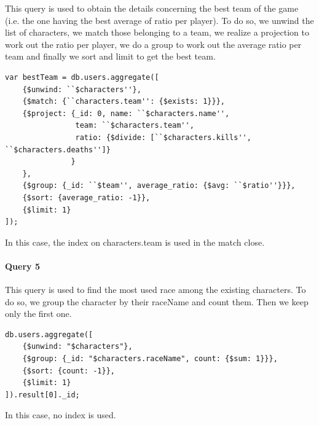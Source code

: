\documentclass[a4paper, 11pt]{article}
\begin{document}
This query is used to obtain the details concerning the best team of the game (i.e. the one having the best average of ratio per player).
To do so, we unwind the list of characters, we match those belonging to a team, we realize a projection to work out the ratio per player, we do a group to work out the average ratio per team and finally we sort and limit to get the best team.

\begin{lstlisting}
var bestTeam = db.users.aggregate([
    {$unwind: ``$characters''}, 
    {$match: {``characters.team'': {$exists: 1}}},
    {$project: {_id: 0, name: ``$characters.name'',
                team: ``$characters.team'', 
                ratio: {$divide: [``$characters.kills'', ``$characters.deaths'']}
               }
    },
    {$group: {_id: ``$team'', average_ratio: {$avg: ``$ratio''}}},
    {$sort: {average_ratio: -1}},
    {$limit: 1}
]);
\end{lstlisting}

In this case, the index on characters.team is used in the match close.

\paragraph*{Query 5\\}
This query is used to find the most used race among the existing characters. To do so, we group the character by their raceName and count them. Then we keep only the first one.

\begin{lstlisting}
db.users.aggregate([
    {$unwind: "$characters"},
    {$group: {_id: "$characters.raceName", count: {$sum: 1}}},
    {$sort: {count: -1}},
    {$limit: 1}
]).result[0]._id;
\end{lstlisting}

In this case, no index is used.
\end{document}
